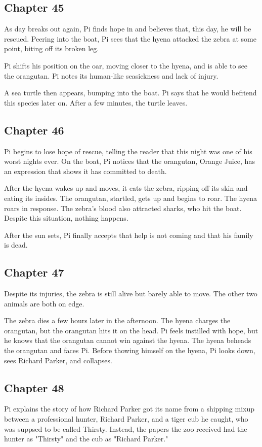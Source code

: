 \documentclass[11pt]{article}
\begin{document}
\subsection{Chapter 45}
\label{sec:orge8cea30}
As day breaks out again, Pi finds hope in and believes that, this day, he will be rescued. Peering into the boat, Pi sees that the hyena attacked the zebra at some point, biting off its broken leg.

Pi shifts his position on the oar, moving closer to the hyena, and is able to see the orangutan. Pi notes its human-like seasickness and lack of injury.

A sea turtle then appears, bumping into the boat. Pi says that he would befriend this species later on. After a few minutes, the turtle leaves.
\subsection{Chapter 46}
\label{sec:orgf67303d}
Pi begins to lose hope of rescue, telling the reader that this night was one of his worst nights ever. On the boat, Pi notices that the orangutan, Orange Juice, has an expression that shows it has committed to death.

After the hyena wakes up and moves, it eats the zebra, ripping off its skin and eating its insides. The orangutan, startled, gets up and begins to roar. The hyena roars in response. The zebra's blood also attracted sharks, who hit the boat. Despite this situation, nothing happens.

After the sun sets, Pi finally accepts that help is not coming and that his family is dead.
\subsection{Chapter 47}
\label{sec:org22cb054}
Despite its injuries, the zebra is still alive but barely able to move. The other two animals are both on edge.

The zebra dies a few hours later in the afternoon. The hyena charges the orangutan, but the orangutan hits it on the head. Pi feels instilled with hope, but he knows that the orangutan cannot win against the hyena. The hyena beheads the orangutan and faces Pi. Before thowing himself on the hyena, Pi looks down, sees Richard Parker, and collapses.
\subsection{Chapter 48}
\label{sec:orgdfacc65}
Pi explains the story of how Richard Parker got its name from a shipping mixup between a professional hunter, Richard Parker, and a tiger cub he caught, who was suppsed to be called Thirsty. Instead, the papers the zoo received had the hunter as "Thirsty" and the cub as "Richard Parker."
\end{document}
